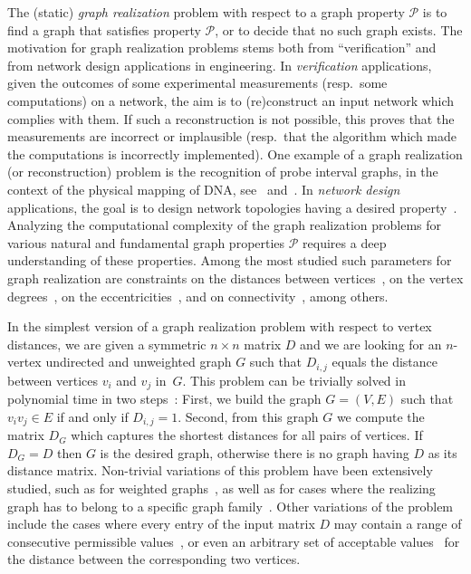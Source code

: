 \documentclass[a4paper,UKenglish,cleveref, autoref, thm-restate, anonymous]{lipics-v2021}
\begin{document}
The (static) \emph{graph realization} problem with respect to a graph property $\mathcal{P}$ is to find a graph that satisfies property $\mathcal{P}$, or to decide that no such graph exists. 
The motivation for graph realization problems stems both from ``verification'' and from network design applications in engineering. 
In \emph{verification} applications, given the outcomes of some experimental measurements (resp.~some computations) on a network, 
the aim is to (re)construct an input network which complies with them. 
If such a reconstruction is not possible, this proves that the measurements are incorrect or implausible (resp.~that the algorithm which made the computations is incorrectly implemented). 
One example of a graph realization (or reconstruction) problem is the recognition of probe interval graphs, in the context of the physical mapping of DNA, see~\cite{McMorris98,McConnellS02} and~\cite[Chapter 4]{GolumbicTrenk04}.
In \emph{network design} applications, the goal is to design network topologies having a desired property~\cite{augustine2022distributed,grotschel1995design}.
Analyzing the computational complexity of the graph realization problems for various natural and fundamental graph properties $\mathcal{P}$ requires a deep understanding of these properties.
Among the most studied such parameters for graph realization 
are constraints on the distances between vertices~\cite{barNoy2022GraphRealization,barNoy2021composed,hakimi1965distance,chung2001distance,bixby1988almost,culberson1989fast}, 
on the vertex degrees~\cite{GolovachM17,gomory1961multi,hakimi1962realizability,Bar-NoyCPR20,erdos1960graphs}, 
on the eccentricities~\cite{barNoy2020efficiently,hell2009linear,behzad1976eccentric,lesniak1975eccentric}, and on connectivity~\cite{fulkerson1960zero,frank1992augmenting,chen1966realization,frank1994connectivity,frank1970connectivity,gomory1961multi}, among others. 


In the simplest version of a graph realization problem with respect to vertex distances, 
we are given a symmetric $n \times n$ matrix $D$ and we are looking for an $n$-vertex undirected and unweighted graph $G$ such that $D_{i,j}$ equals the distance between vertices $v_i$ and $v_j$ in~$G$. This problem can be trivially solved in polynomial time in two steps~\cite{hakimi1965distance}: First, we build the graph $G=(V,E)$ such that $v_i v_j \in E$ if and only if $D_{i,j}=1$. Second, from this graph $G$ we compute the matrix $D_G$ which captures the shortest distances for all pairs of vertices. If $D_G = D$ then $G$ is the desired graph, otherwise there is no graph having $D$ as its distance matrix. 
Non-trivial variations of this problem have been extensively studied, such as for weighted graphs~\cite{hakimi1965distance,Patrinos-Hakimi-72}, as well as for cases where the realizing graph has to belong to a specific graph family~\cite{hakimi1965distance, barNoy2021composed}. Other variations of the problem include the cases where every entry of the input matrix $D$ may contain a range of consecutive permissible values~\cite{barNoy2021composed,Rubei16,Tamura93}, or even an arbitrary set of acceptable values~\cite{barNoy2022GraphRealization} for the distance between the corresponding two vertices. 
\end{document}
